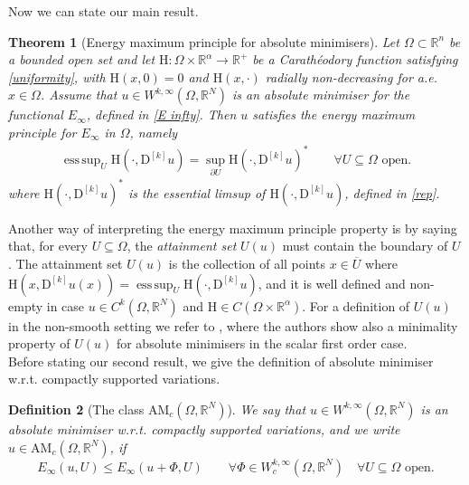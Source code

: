 \documentclass[a4paper,11pt]{article}
\numberwithin{equation}{section}
\newtheorem{Theorem}{Theorem}[section]
\newtheorem{Definition}[Theorem]{Definition}
\newcommand{\numberset}{\mathbb}
\newcommand{\Om}{\Omega}
\newcommand{\R}{\numberset{R}}
\newcommand{\rom}{\mathrm}
\DeclareMathOperator*{\esssup}{ess\,sup}
\theoremstyle{definition}
\begin{document}
Now we can state our main result.
\begin{Theorem}[Energy maximum principle for absolute minimisers]\label{thm1}
Let $\Om\subset\R^n$ be a bounded open set and let $\rom{H}:\Om\times\R^\alpha\to\R^+$ be a Carathéodory function satisfying \eqref{uniformity}, with $\rom{H}(x,0)=0$ and $\rom{H}(x, \cdot)$ radially non-decreasing for a.e. $x\in\Om$. Assume that $u\in W^{k,\infty}(\Om,\R^N)$ is an absolute minimiser for the functional $E_\infty$, defined in \eqref{E infty}. Then $u$ satisfies the energy maximum principle for $E_\infty$ in $\Om$, namely
\begin{align}\label{MP}
\esssup_U \rom{H}(\cdot, \mathrm D ^{[k]}u)=\sup_{\partial U}\rom{H}(\cdot,\mathrm D ^{[k]}u)^*\qquad\forall U\subseteq\Om \mbox{ open}.
\end{align}
where $\rom{H}(\cdot,\mathrm D ^{[k]}u)^*$ is the essential limsup of $\rom{H}(\cdot,\mathrm D ^{[k]}u)$, defined in \eqref{rep}.
\end{Theorem}
Another way of interpreting the energy maximum principle property is by saying that, for every $U\subseteq\Om$, the \textit{attainment set} $U(u)$ must contain the boundary of $U$. The attainment set $U(u)$ is the collection of all points $x\in \overline U$ where $\rom{H}(x, \mathrm D ^{[k]}u(x))=\esssup_U \rom{H}(\cdot, \mathrm D ^{[k]}u)$, and it is well defined and non-empty in case $u\in C^k(\Om,\R^N)$ and $\rom{H}\in C(\Om\times\R^\alpha)$. For a definition of $U(u)$ in the non-smooth setting we refer to \cite{BDP}, where the authors show also a minimality property of $U(u)$ for absolute minimisers in the scalar first order case.\\

Before stating our second result, we give the definition of absolute minimiser w.r.t. compactly supported variations. 
\begin{Definition}[The class $\mathrm {AM}_c(\Om,\R^N)$]
We say that $u\in W^{k,\infty}(\Om,\R^N)$ is an absolute minimiser w.r.t. compactly supported variations, and we write $u\in \mathrm {AM}_c(\Om,\R^N)$, if
$$
E_\infty(u,U)\leq E_\infty (u+\Phi,U)\qquad\forall \Phi\in W^{k,\infty}_c(\Om,\R^N)\quad\forall U\subseteq\Om\mbox{ open}.
$$
\end{Definition}
\end{document}
